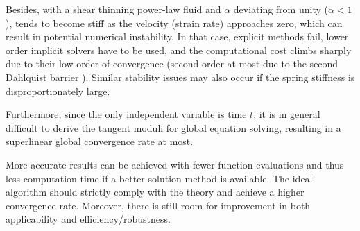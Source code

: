 \begin{enumerate}
Besides, with a shear thinning power-law fluid and $\alpha$ deviating from unity ($\alpha<1$),  tends to become stiff as the velocity (strain rate) approaches zero, which can result in potential numerical instability.
In that case, explicit methods fail, lower order implicit solvers have to be used, and the computational cost climbs sharply due to their low order of convergence (second order at most due to the second Dahlquist barrier \cite{Dahlquist1963}).
Similar stability issues may also occur if the spring stiffness is disproportionately large.

Furthermore, since the only independent variable is time $t$, it is in general difficult to derive the tangent moduli for global equation solving, resulting in a superlinear global convergence rate at most.
\end{enumerate}
More accurate results can be achieved with fewer function evaluations and thus less computation time if a better solution method is available.
The ideal algorithm should strictly comply with the theory and achieve a higher convergence rate.
Moreover, there is still room for improvement in both applicability and efficiency/robustness.
